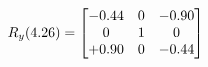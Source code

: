 \documentclass[preview]{standalone}
\begin{document}
\begin{align*}
\special{dvisvgm:raw <g id='unique000'>}R_{y}(4.26) = \begin{bmatrix}-0.44 & 0 & -0.90 \\0 & 1 & 0 \\+0.90 & 0 & -0.44\end{bmatrix}\special{dvisvgm:raw </g>}
\end{align*}
\end{document}
